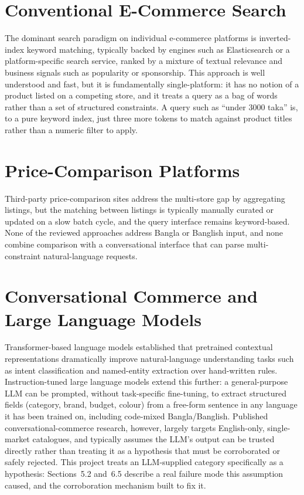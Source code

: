 \documentclass[12pt,a4paper]{report}
\begin{document}
\section{Conventional E-Commerce Search}
The dominant search paradigm on individual e-commerce platforms is inverted-index keyword matching,
typically backed by engines such as Elasticsearch or a platform-specific search service, ranked by a
mixture of textual relevance and business signals such as popularity or sponsorship. This approach is well
understood and fast, but it is fundamentally single-platform: it has no notion of a product listed on a
competing store, and it treats a query as a bag of words rather than a set of structured constraints. A
query such as ``under 3000 taka'' is, to a pure keyword index, just three more tokens to match against
product titles rather than a numeric filter to apply.

\section{Price-Comparison Platforms}
Third-party price-comparison sites address the multi-store gap by aggregating listings, but the matching
between listings is typically manually curated or updated on a slow batch cycle, and the query interface
remains keyword-based. None of the reviewed approaches address Bangla or Banglish input, and none combine
comparison with a conversational interface that can parse multi-constraint natural-language requests.

\section{Conversational Commerce and Large Language Models}
Transformer-based language models \cite{devlin2019,reimers2019} established that pretrained contextual
representations dramatically improve natural-language understanding tasks such as intent classification
and named-entity extraction over hand-written rules. Instruction-tuned large language models extend this
further: a general-purpose LLM can be prompted, without task-specific fine-tuning, to extract structured
fields (category, brand, budget, colour) from a free-form sentence in any language it has been trained on,
including code-mixed Bangla/Banglish. Published conversational-commerce research, however, largely targets
English-only, single-market catalogues, and typically assumes the LLM's output can be trusted directly
rather than treating it as a hypothesis that must be corroborated or safely rejected. This project treats
an LLM-supplied category specifically as a hypothesis: Sections~5.2 and~6.5 describe a real failure mode
this assumption caused, and the corroboration mechanism built to fix it.
\end{document}
